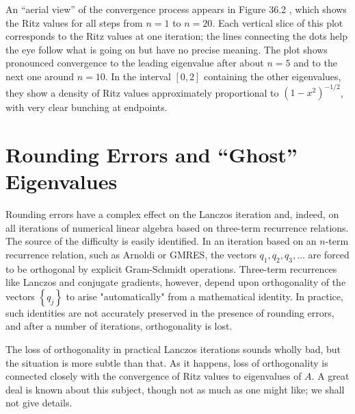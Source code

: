 An ``aerial view'' of the convergence process appears in Figure 36.2 , which shows the Ritz values for all steps from $n=1$ to $n=20$. Each vertical slice of this plot corresponds to the Ritz values at one iteration; the lines connecting the dots help the eye follow what is going on but have no precise meaning. The plot shows pronounced convergence to the leading eigenvalue after about $n=5$ and to the next one around $n=10$. In the interval $[0,2]$ containing the other eigenvalues, they show a density of Ritz values approximately proportional to $\left(1-x^2\right)^{-1 / 2}$, with very clear bunching at endpoints.

\section{Rounding Errors and ``Ghost'' Eigenvalues}
Rounding errors have a complex effect on the Lanczos iteration and, indeed, on all iterations of numerical linear algebra based on three-term recurrence relations. The source of the difficulty is easily identified. In an iteration based on an $n$-term recurrence relation, such as Arnoldi or GMRES, the vectors $q_1, q_2, q_3, \ldots$ are forced to be orthogonal by explicit Gram-Schmidt operations. Three-term recurrences like Lanczos and conjugate gradients, however, depend upon orthogonality of the vectors $\left\{q_j\right\}$ to arise "automatically" from a mathematical identity. In practice, such identities are not accurately preserved in the presence of rounding errors, and after a number of iterations, orthogonality is lost.

The loss of orthogonality in practical Lanczos iterations sounds wholly bad, but the situation is more subtle than that. As it happens, loss of orthogonality is connected closely with the convergence of Ritz values to eigenvalues of $A$. A great deal is known about this subject, though not as much as one might like; we shall not give details.

